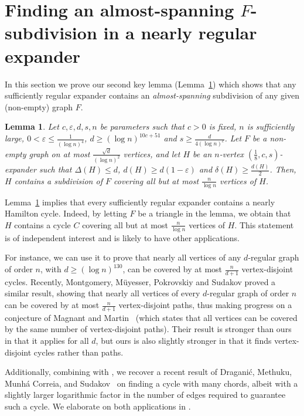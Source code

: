 \documentclass[10pt]{article}
\theoremstyle{plain}
\numberwithin{theorem}{section}
\newtheorem{lemma}[theorem]{Lemma}
\theoremstyle{definition}
\theoremstyle{remark}
\newcommand{\eps}{\varepsilon}
\theoremstyle{plain}
\begin{document}
	
\section{Finding an almost-spanning \texorpdfstring{$F$}{F}-subdivision in a nearly regular expander}
\label{sec:almostspanningFsubdivisioninexpander}

In this section we prove our second key lemma (Lemma~\ref{lem:almostspannningtopological}) which shows that any sufficiently regular expander contains an \emph{almost-spanning} subdivision of any given (non-empty) graph $F$.

\begin{lemma}
	\label{lem:almostspannningtopological}
	Let $c, \eps, d, s, n$ be parameters such that $c > 0$ is fixed, $n$ is sufficiently large, $0 < \eps \le \frac{1}{(\log n)^{4}}$, $d \ge (\log n)^{10c+51}$ and $s \ge \frac{d}{4 (\log n)^{c}}$.
	Let $F$ be a non-empty graph on at most $\frac{\sqrt{d}}{(\log n)^{2}}$ vertices, and let $H$ be an $n$-vertex $(\frac{1}{8}, c, s)$-expander such that $\Delta(H) \le d$, $d(H) \ge d(1 - \eps)$ and $\delta(H) \ge \frac{d(H)}{2}$. Then, $H$ contains a subdivision of $F$ covering all but at most $\frac{n}{\log n}$ vertices of $H$.
\end{lemma}


Lemma~\ref{lem:almostspannningtopological} implies that every sufficiently regular expander contains a nearly Hamilton cycle. Indeed, by letting $F$ be a triangle in the lemma, we obtain that $H$ contains a cycle $C$ covering all but at most $\frac{n}{\log n}$ vertices of $H$. 
This statement is of independent interest and is likely to have other applications. 

For instance, we can use it to prove that nearly all vertices of any $d$-regular graph of order $n$, with $d \ge (\log n)^{130}$, can be covered by at most $\frac{n}{d+1}$ vertex-disjoint cycles.    
Recently, Montgomery, M\"uyesser, Pokrovskiy and Sudakov \cite{montgomery2024approximate} proved a similar result, showing that nearly all vertices of every $d$-regular graph of order $n$ can be covered by at most $\frac{n}{d+1}$ vertex-disjoint paths, thus making progress on a conjecture of Magnant and Martin~\cite{magnant2009note} (which states that all vertices can be covered by the same number of vertex-disjoint paths). Their result is stronger than ours in that it applies for all $d$, but ours is also slightly stronger in that it finds vertex-disjoint cycles rather than paths.

Additionally, combining  with , 
we recover a recent result of Dragani\'c, Methuku, Munh\'a Correia, and Sudakov~\cite{draganic2023cycles} 
on finding a cycle with many chords, albeit with a slightly larger logarithmic factor 
in the number of edges required to guarantee such a cycle. We elaborate on both applications in .
 
\end{document}
